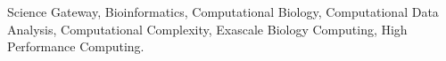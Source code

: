 \documentclass[3p,times]{elsarticle}
\begin{document}
\begin{frontmatter}
\begin{abstract}
%

\end{abstract}

\begin{keyword}Science Gateway, Bioinformatics, Computational Biology, Computational Data Analysis, Computational Complexity, Exascale Biology Computing, High Performance Computing.

\end{keyword}
\end{frontmatter}




















\end{document}
